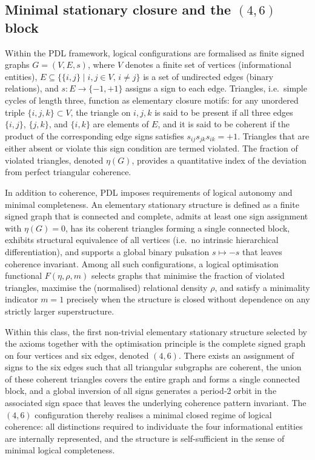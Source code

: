 \documentclass[11pt,a4paper]{article}
\begin{document}
\subsection{Minimal stationary closure and the \texorpdfstring{$(4,6)$}{(4,6)} block}
Within the PDL framework, logical configurations are formalised as finite signed graphs $G=(V,E,s)$, where $V$ denotes a finite set of vertices (informational entities), $E \subseteq \{\{i,j\} \mid i,j \in V,\, i\neq j\}$ is a set of undirected edges (binary relations), and $s:E\to\{-1,+1\}$ assigns a sign to each edge.\cite{LaubscherIntroPDL2026,LaubscherPDLFull2026} Triangles, i.e.\ simple cycles of length three, function as elementary closure motifs: for any unordered triple $\{i,j,k\}\subset V$, the triangle on $i,j,k$ is said to be present if all three edges $\{i,j\}$, $\{j,k\}$, and $\{i,k\}$ are elements of $E$, and it is said to be coherent if the product of the corresponding edge signs satisfies $s_{ij}s_{jk}s_{ik}=+1$.\cite{LaubscherPDLFull2026,LaubscherLDP2026} Triangles that are either absent or violate this sign condition are termed violated. The fraction of violated triangles, denoted $\eta(G)$, provides a quantitative index of the deviation from perfect triangular coherence.\cite{LaubscherPDLFull2026}

In addition to coherence, PDL imposes requirements of logical autonomy and minimal completeness. An elementary stationary structure is defined as a finite signed graph that is connected and complete, admits at least one sign assignment with $\eta(G)=0$, has its coherent triangles forming a single connected block, exhibits structural equivalence of all vertices (i.e.\ no intrinsic hierarchical differentiation), and supports a global binary pulsation $s\mapsto -s$ that leaves coherence invariant.\cite{LaubscherPDLFull2026,LaubscherLDP2026,LaubscherIMRadPDL2026} Among all such configurations, a logical optimisation functional $F(\eta,\rho,m)$ selects graphs that minimise the fraction of violated triangles, maximise the (normalised) relational density $\rho$, and satisfy a minimality indicator $m=1$ precisely when the structure is closed without dependence on any strictly larger superstructure.\cite{LaubscherIntroPDL2026,LaubscherPDLFull2026}

Within this class, the first non-trivial elementary stationary structure selected by the axioms together with the optimisation principle is the complete signed graph on four vertices and six edges, denoted $(4,6)$.\cite{LaubscherIntroPDL2026,LaubscherPDLFull2026} There exists an assignment of signs to the six edges such that all triangular subgraphs are coherent, the union of these coherent triangles covers the entire graph and forms a single connected block, and a global inversion of all signs generates a period‑2 orbit in the associated sign space that leaves the underlying coherence pattern invariant.\cite{LaubscherPDLFull2026,LaubscherLDP2026} The $(4,6)$ configuration thereby realises a minimal closed regime of logical coherence: all distinctions required to individuate the four informational entities are internally represented, and the structure is self-sufficient in the sense of minimal logical completeness.
\end{document}
